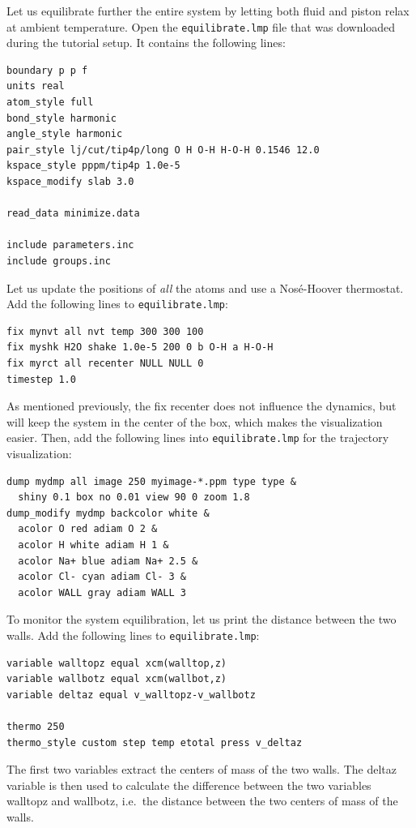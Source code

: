 \documentclass[9pt,tutorial]{livecoms}
\newcommand{\lmpcmd}[1]{\hspace{0pt}\colorbox{listing}{\textcolor{command}{\small{#1}}}\hspace{0pt}} %
\newcommand{\flecmd}[1]{\textcolor{command}{\texttt{#1}}} %
\begin{document}
Let us equilibrate further the entire system by letting both fluid and piston
relax at ambient temperature.  Open the \flecmd{equilibrate.lmp} file that was
downloaded during the tutorial setup.  It contains the following lines:
\begin{lstlisting}
boundary p p f
units real
atom_style full
bond_style harmonic
angle_style harmonic
pair_style lj/cut/tip4p/long O H O-H H-O-H 0.1546 12.0
kspace_style pppm/tip4p 1.0e-5
kspace_modify slab 3.0

read_data minimize.data

include parameters.inc
include groups.inc
\end{lstlisting}

Let us update the positions of \emph{all} the atoms and use a Nosé-Hoover
thermostat.  Add the following lines to \flecmd{equilibrate.lmp}:
\begin{lstlisting}
fix mynvt all nvt temp 300 300 100
fix myshk H2O shake 1.0e-5 200 0 b O-H a H-O-H
fix myrct all recenter NULL NULL 0
timestep 1.0
\end{lstlisting}
As mentioned previously, the \lmpcmd{fix recenter} does not influence the dynamics,
but will keep the system in the center of the box, which makes the
visualization easier.  Then, add the following lines into \flecmd{equilibrate.lmp}
for the trajectory visualization:
\begin{lstlisting}
dump mydmp all image 250 myimage-*.ppm type type &
  shiny 0.1 box no 0.01 view 90 0 zoom 1.8
dump_modify mydmp backcolor white &
  acolor O red adiam O 2 &
  acolor H white adiam H 1 &
  acolor Na+ blue adiam Na+ 2.5 &
  acolor Cl- cyan adiam Cl- 3 &
  acolor WALL gray adiam WALL 3
\end{lstlisting}

To monitor the system equilibration, let us print the distance between
the two walls.  Add the following lines to \flecmd{equilibrate.lmp}:
\begin{lstlisting}
variable walltopz equal xcm(walltop,z)
variable wallbotz equal xcm(wallbot,z)
variable deltaz equal v_walltopz-v_wallbotz

thermo 250
thermo_style custom step temp etotal press v_deltaz
\end{lstlisting}
The first two variables extract the centers of mass of the two walls.  The
\lmpcmd{deltaz} variable is then used to calculate the difference between the two
variables \lmpcmd{walltopz} and \lmpcmd{wallbotz}, i.e.~the distance between the
two centers of mass of the walls.
\end{document}
